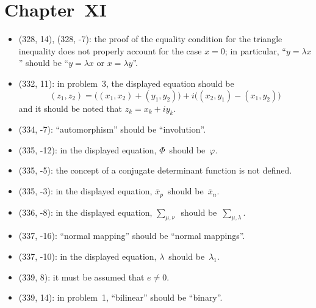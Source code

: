 \documentclass[letterpaper,12pt]{article}
\newcommand{\iprod}[2]{(#1,#2)}
\begin{document}
\section*{Chapter~XI}
\begin{itemize}
\item (328, 14), (328, -7): the proof of the equality condition for the triangle inequality does not properly account for the case \(x=0\); in particular, ``\(y=\lambda x\)'' should be ``\(y=\lambda x\) or \(x=\lambda y\)''.
\item (332, 11): in problem~3, the displayed equation should be
\[\iprod{z_1}{z_2}=\bigl(\iprod{x_1}{x_2}+\iprod{y_1}{y_2}\bigr)+i\bigl(\iprod{x_2}{y_1}-\iprod{x_1}{y_2}\bigr)\]
and it should be noted that \(z_k=x_k+iy_k\).
\item (334, -7): ``automorphism'' should be ``involution''.
\item (335, -12): in the displayed equation, \(\Phi\)~should be~\(\varphi\).
\item (335, -5): the concept of a conjugate determinant function is not defined.
\item (335, -3): in the displayed equation, \(\bar{x}_p\)~should be~\(\bar{x}_n\).
\item (336, -8): in the displayed equation, \(\displaystyle\sum_{\mu,\nu}\)~should be~\(\displaystyle\sum_{\mu,\lambda}\).
\item (337, -16): ``normal mapping'' should be ``normal mappings''.
\item (337, -10): in the displayed equation, \(\lambda\)~should be~\(\lambda_1\).
\item (339, 8): it must be assumed that \(e\ne 0\).
\item (339, 14): in problem~1, ``bilinear'' should be ``binary''.
\end{itemize}
\end{document}
